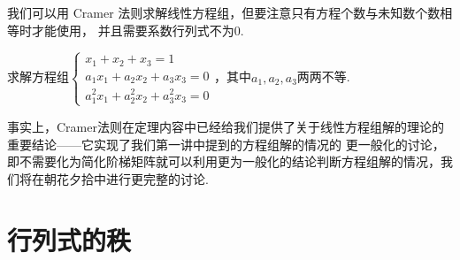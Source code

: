我们可以用 Cramer 法则求解线性方程组，但要注意只有方程个数与未知数个数相等时才能使用，
并且需要系数行列式不为0.
\begin{example}
    求解方程组$\begin{cases}
        x_1+x_2+x_3=1 \\
        a_1x_1+a_2x_2+a_3x_3=0 \\
        a_1^2x_1+a_2^2x_2+a_3^2x_3=0
    \end{cases}$，其中$a_1,a_2,a_3$两两不等.
\end{example}
\begin{solution}

\end{solution}

事实上，Cramer法则在定理内容中已经给我们提供了关于线性方程组解的理论的重要结论——它实现了我们第一讲中提到的方程组解的情况的
更一般化的讨论，即不需要化为简化阶梯矩阵就可以利用更为一般化的结论判断方程组解的情况，我们将在朝花夕拾中进行更完整的讨论.

\section{行列式的秩}
